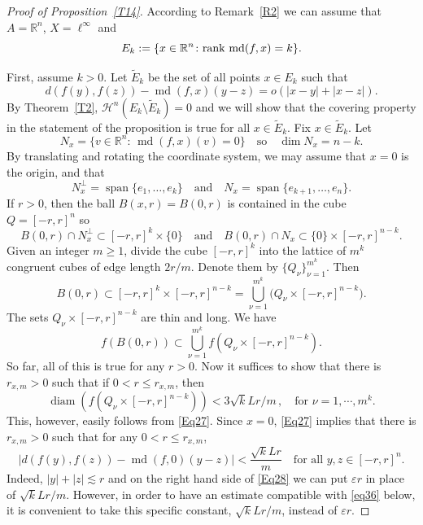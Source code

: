 \documentclass[12pt,leqno]{amsart}
\theoremstyle{definition}
\newcommand{\bbbr}{\mathbb R}
\newcommand{\eps}{\varepsilon}
\def\diam{\operatorname{diam}}
\def\H{{\mathcal H}}
\def\rank{{\rm rank\,}}
\def\md{\operatorname{md}}
\numberwithin{theorem}{section} \numberwithin{equation}{section}
\begin{document}
\begin{proof}[Proof of Proposition~\ref{T14}]
According to Remark~\ref{R2} we can assume that $A=\bbbr^n$, $X=\ell^\infty$ and
$$
E_k:=\{x\in \bbbr^n\colon \rank\md(f,x)=k\}.
$$

First, assume $k>0$. Let $\tilde{E}_k$ be the set of all points $x\in E_k$ such that
\begin{equation}
\label{Eq27}
d(f(y),f(z))-\md(f,x)(y-z)=o(|x-y|+|x-z|).
\end{equation}
By Theorem~\ref{T2}, $\H^n(E_k\setminus\tilde{E}_k)=0$ and we will show that the covering property in the statement of the proposition is true for all $x\in\tilde{E}_k$.
Fix $x\in\tilde{E}_k$. Let
$$
N_x=\{v\in\bbbr^n:\, \md(f,x)(v)=0\}
\quad
\text{so}
\quad
\dim N_x=n-k.
$$
By translating and rotating the coordinate system, we may assume that $x=0$ is the origin, and that
$$
N_x^\perp=\operatorname{span}\{ e_1,\ldots,e_k\}
\quad
\text{and}
\quad
N_x=\operatorname{span}\{e_{k+1},\ldots,e_n\}.
$$
If $r>0$, then the ball $B(x,r)=B(0,r)$ is contained in the cube $Q=[-r,r]^n$ so
$$
B(0,r)\cap N_x^\perp\subset [-r,r]^k\times\{0\}
\quad
\text{and}
\quad
B(0,r)\cap N_x\subset\{ 0\}\times [-r,r]^{n-k}.
$$
Given an integer $m\geq 1$, divide the cube $[-r,r]^k$ into the lattice of $m^k$ congruent cubes of edge length $2r/m$. Denote them by $\{ Q_\nu\}_{\nu=1}^{m^k}$. Then
$$
B(0,r)\subset [-r,r]^k\times [-r,r]^{n-k}=\bigcup_{\nu=1}^{m^k} \big(Q_\nu\times [-r,r]^{n-k}\big).
$$
The sets $Q_\nu\times [-r,r]^{n-k}$ are thin and long. We have
$$
f(B(0,r))\subset\bigcup_{\nu=1}^{m^k}f(Q_\nu\times [-r,r]^{n-k}).
$$
So far, all of this is true for any $r>0$. Now it suffices to show that there is $r_{x,m}>0$ such that if $0<r\leq r_{x,m}$, then
\begin{equation}
\label{Eq29}
\diam(f(Q_\nu\times [-r,r]^{n-k}))< 3\sqrt{k}Lr/m\, , \quad \text{for $\nu=1,\cdots,m^k$.}
\end{equation}
This, however, easily follows from \eqref{Eq27}. Since $x=0$, \eqref{Eq27} implies that there is $r_{x,m}>0$ such that for any $0<r\leq r_{x,m}$,
\begin{equation}
\label{Eq28}
|d(f(y),f(z))-\md(f,0)(y-z)|< \frac{\sqrt{k}Lr}{m}
\quad
\text{for all $y,z\in [-r,r]^n$.}
\end{equation}
Indeed, $|y|+|z|\lesssim r$ and on the right hand side of \eqref{Eq28} we can put $\eps r$ in place of $\sqrt{k}Lr/m$.
However, in order to have an estimate compatible with \eqref{eq36} below,
it is convenient to take this specific constant, $\sqrt{k}Lr/m$, instead of $\eps r$.


\end{proof}
\end{document}
